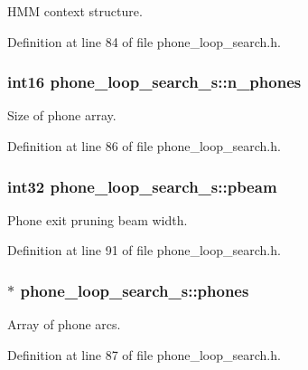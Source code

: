 H\-M\-M context structure. 



Definition at line 84 of file phone\-\_\-loop\-\_\-search.\-h.

\subsubsection[{n\-\_\-phones}]{\setlength{\rightskip}{0pt plus 5cm}int16 phone\-\_\-loop\-\_\-search\-\_\-s\-::n\-\_\-phones}\label{structphone__loop__search__s_a7844f45806d19d229504378da16bdc4c}


Size of phone array. 



Definition at line 86 of file phone\-\_\-loop\-\_\-search.\-h.

\subsubsection[{pbeam}]{\setlength{\rightskip}{0pt plus 5cm}int32 phone\-\_\-loop\-\_\-search\-\_\-s\-::pbeam}\label{structphone__loop__search__s_aaace8b677a536e41bb4616e6695b11d3}


Phone exit pruning beam width. 



Definition at line 91 of file phone\-\_\-loop\-\_\-search.\-h.

\subsubsection[{phones}]{$\ast$ phone\-\_\-loop\-\_\-search\-\_\-s\-::phones}\label{structphone__loop__search__s_af543cdcfbfd8d43e5beba4bd6c47fd80}


Array of phone arcs. 



Definition at line 87 of file phone\-\_\-loop\-\_\-search.\-h.

